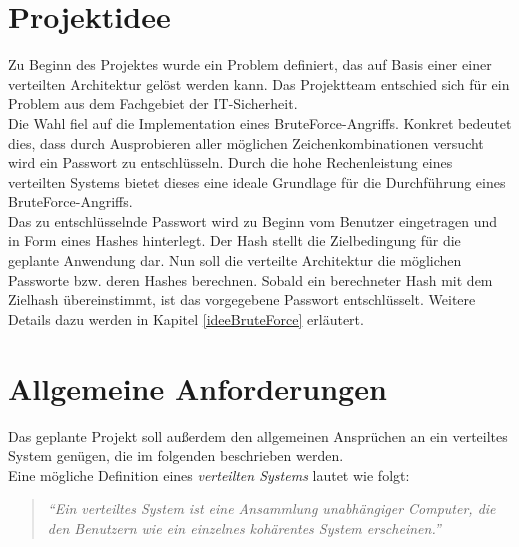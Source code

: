 \section{Projektidee}
\label{Projektidee}
Zu Beginn des Projektes wurde ein Problem definiert, das auf Basis einer einer verteilten Architektur gelöst werden kann. Das Projektteam entschied sich für ein Problem aus dem Fachgebiet der IT-Sicherheit.\\
Die Wahl fiel auf die Implementation eines BruteForce-Angriffs. Konkret bedeutet dies, dass durch Ausprobieren aller möglichen Zeichenkombinationen versucht wird ein Passwort zu entschlüsseln. Durch die hohe Rechenleistung eines verteilten Systems bietet dieses eine ideale Grundlage für die Durchführung eines BruteForce-Angriffs.\\
 Das zu entschlüsselnde Passwort wird zu Beginn vom Benutzer eingetragen und in Form eines Hashes hinterlegt. Der Hash stellt die Zielbedingung für die geplante Anwendung dar. Nun soll die verteilte Architektur die möglichen Passworte bzw. deren Hashes berechnen. Sobald ein berechneter Hash mit dem Zielhash übereinstimmt, ist das vorgegebene Passwort entschlüsselt. Weitere Details dazu werden in Kapitel \ref{ideeBruteForce} erläutert. \\
 


\section{Allgemeine Anforderungen}
\label{allgemeineAnforderungen}
Das geplante Projekt soll außerdem den allgemeinen Ansprüchen an ein verteiltes System genügen, die im folgenden beschrieben werden. \\
Eine mögliche Definition eines \emph{verteilten Systems} lautet wie folgt:
\begin{quotation}
	\textit{\enquote{Ein verteiltes System ist eine Ansammlung unabhängiger Computer, die den Benutzern wie ein einzelnes kohärentes System erscheinen.}} \citep{tanenbaum}
\end{quotation}

